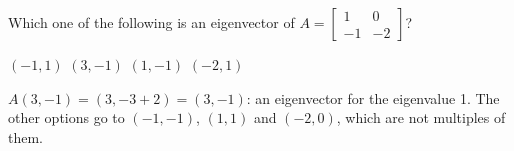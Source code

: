 \begin{question}[id=gate-in2005-2, source=GATE IN 2005]
Which one of the following is an eigenvector of $A = \begin{bmatrix} 1 & 0 \\ -1 & -2 \end{bmatrix}$?
\begin{options}
  \option $(-1, 1)$
  \correct $(3, -1)$
  \option $(1, -1)$
  \option $(-2, 1)$
\end{options}
\begin{solution}
$A(3, -1) = (3, -3 + 2) = (3, -1)$: an eigenvector for the eigenvalue 1. The other options go to $(-1, -1)$, $(1, 1)$ and $(-2, 0)$, which are not multiples of them.
\end{solution}
\end{question}

